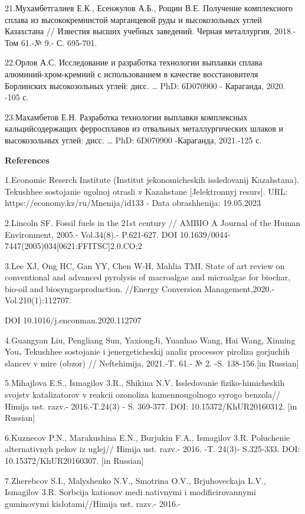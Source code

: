 21.Мухамбетгалиев Е.К., Есенжулов А.Б., Рощин В.Е. Получение
комплексного сплава из высококремнистой марганцевой руды и высокозольных
углей Казахстана // Известия высших учебных заведений. Черная
металлургия, 2018.-Том 61.-№ 9.- С. 695-701.

22.Орлов А.С. Исследование и разработка технологии выплавки сплава
алюминий-хром-кремний с использованием в качестве восстановителя
Борлинских высокозольных углей: дисс. \ldots{} PhD: 6D070900 -
Караганда, 2020. -105 с.

23.Махамбетов Е.Н. Разработка технологии выплавки комплексных
кальцийсодержащих ферросплавов из отвальных металлургических шлаков и
высокозольных углей: дисс. \ldots{} PhD: 6D070900 -Караганда, 2021.-125
с.

{\bfseries References}

1.Economic Reserch Institute (Institut jekonomicheskih issledovanij
Kazahstana). Tekushhee sostojanie ugol\textquotesingle noj otrasli v
Kazahstane {[}Jelektronnyj resurs{]}. URL:
https://economy.kz/ru/Mnenija/id133 - Data obrashhenija: 19.05.2023

2.Lincoln SF. Fossil fuels in the 21st century // AMBIO A Journal of the
Human Environment, 2005.- Vol.34(8).- P.621-627. DOI
10.1639/0044-7447(2005)034{[}0621:FFITSC{]}2.0.CO;2

3.Lee XJ, Ong HC, Gan YY, Chen W-H, Mahlia TMI. State of art review on
conventional and advanced pyrolysis of macroalgae and microalgae for
biochar, bio-oil and biosyngasproduction. //Energy Conversion
Management,2020.-Vol.210(1):112707.

DOI 10.1016/j.enconman.2020.112707

4.Guangyan Liu, Pengliang Sun, YaxiongJi, Yuanhao Wang, Hai Wang,
Xinning You{\bfseries .} Tekushhee sostojanie i jenergeticheskij analiz
processov piroliza gorjuchih slancev v mire (obzor) // Neftehimija,
2021.-T. 61.- № 2. -S. 138-156.{[}in Russian{]}

5.Mihajlova E.S., Ismagilov 3.R., Shikina N.V. Issledovanie
fiziko-himicheskih svojstv katalizatorov v reakcii ozonoliza
kamennougol\textquotesingle nogo syrogo benzola// Himija ust. razv.-
2016.-T.24(3) - S. 369-377. DOI: 10.15372/KhUR20160312. {[}in Russian{]}

6.Kuznecov P.N., Marakushina E.N., Burjukin F.A., Ismagilov 3.R.
Poluchenie al\textquotesingle ternativnyh pekov iz uglej// Himija ust.
razv.- 2016. -T. 24(3)- S.325-333. DOI: 10.15372/KhUR20160307. {[}in
Russian{]}

7.Zherebcov S.I., Malyshenko N.V., Smotrina O.V., Brjuhoveckaja L.V.,
Ismagilov 3.R. Sorbcija kationov medi nativnymi i modificirovannymi
guminovymi kislotami//Himija ust. razv.- 2016.-

